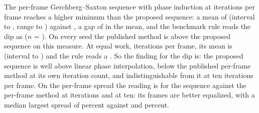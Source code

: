 The per-frame Gerchberg--Saxton sequence with phase induction at \parKimIters{} iterations per frame reaches a higher minimum than the proposed sequence: a mean of \accKimFiveTransMean{} (interval \accKimFiveTransCiLo{} to \accKimFiveTransCiHi{}, range \accKimFiveTransMin{} to \accKimFiveTransMax{}) against \accBTransMean{}, a gap of \dipGap{} in the mean, and the benchmark rule reads the dip as \readThirteenKimFiveDip{} ($n$ = \readThirteenKimFiveDipN). On every seed the published method is above the proposed sequence on this measure. At equal work, \parFrameIters{} iterations per frame, its mean is \accKimTenTransMean{} (interval \accKimTenTransCiLo{} to \accKimTenTransCiHi{}) and the rule reads a \readThirteenKimTenDip{}. So the finding for the dip is: the proposed sequence is well above linear phase interpolation, below the published per-frame method at its own iteration count, and indistinguishable from it at ten iterations per frame. On the per-frame spread the reading is \readThirteenKimFiveSigma{} for the sequence against the per-frame method at \parKimIters{} iterations and \readThirteenKimTenSigma{} at ten: its frames are better equalized, with a median largest spread of \accBSigmaMed{} percent against \accKimFiveSigmaMed{} and \accKimTenSigmaMed{} percent.

\begin{table}[t]
\centering\small
\caption{The time profile of the sequence as a parameter, a comparison added after the results, acceptance task, \parFrames{} frames, \readProfileN{} seeds: transient minimum ratio (mean and 95 percent interval), largest phase step (maximum over seeds), largest per-frame spread (median) and the reading of the benchmark rule against each baseline on the dip, for the default minimal-jerk profile and for the linear profile of the baselines.}
\label{tab:profile}
\end{table}

